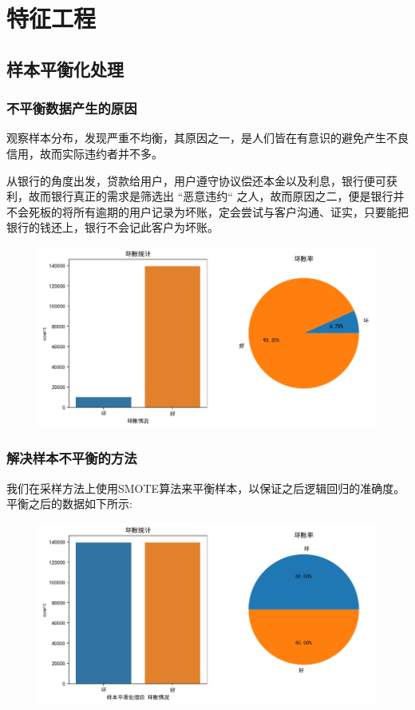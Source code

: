 \documentclass[12pt]{article}
\begin{document}
\newpage
\section{特征工程}

\subsection{样本平衡化处理}

\subsubsection{不平衡数据产生的原因}
\begin{flushleft}
	\noindent\qquad 观察样本分布，发现严重不均衡，其原因之一，是人们皆在有意识的避免产生不良信用，故而实际违约者并不多。 \par
	\noindent\qquad 从银行的角度出发，贷款给用户，用户遵守协议偿还本金以及利息，银行便可获利，故而银行真正的需求是筛选出 “恶意违约“ 之人，故而原因之二，便是银行并不会死板的将所有逾期的用户记录为坏账，定会尝试与客户沟通、证实，只要能把银行的钱还上，银行不会记此客户为坏账。
	
\end{flushleft}



\begin{figure}[H]
	\centering
	\includegraphics[width=0.6\linewidth]{figures/screenshot002}
	\caption{}
\end{figure}


\subsubsection{解决样本不平衡的方法}
\begin{flushleft}
	\noindent\qquad 我们在采样方法上使用SMOTE算法来平衡样本，以保证之后逻辑回归的准确度。平衡之后的数据如下所示:
\end{flushleft}

\begin{figure}[H]
	\centering
	\includegraphics[width=0.6\linewidth]{figures/screenshot003}
	\caption{}
\end{figure}
\end{document}
